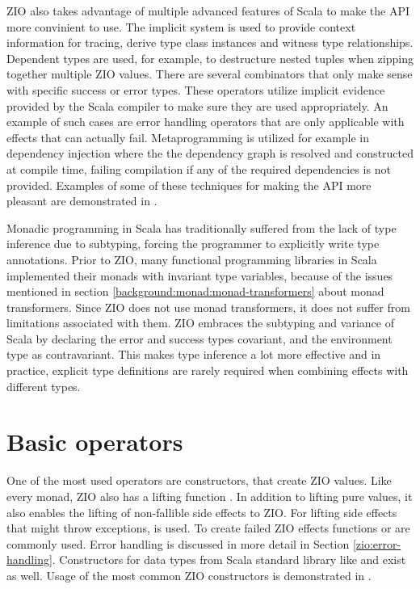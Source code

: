 ZIO also takes advantage of multiple advanced features of Scala to make the API more convinient to use. The implicit system is used to provide context information for tracing, derive type class instances and witness type relationships. Dependent types are used, for example, to destructure nested tuples when zipping together multiple ZIO values. There are several combinators that only make sense with specific success or error types. These operators utilize implicit evidence provided by the Scala compiler to make sure they are used appropriately. An example of such cases are error handling operators that are only applicable with effects that can actually fail. Metaprogramming is utilized for example in dependency injection where the the dependency graph is resolved and constructed at compile time, failing compilation if any of the required dependencies is not provided. Examples of some of these techniques for making the API more pleasant are demonstrated in .



Monadic programming in Scala has traditionally suffered from the lack of type inference due to subtyping, forcing the programmer to explicitly write type annotations. Prior to ZIO, many functional programming libraries in Scala implemented their monads with invariant type variables, because of the issues mentioned in section \ref{background:monad:monad-transformers} about monad transformers. Since ZIO does not use monad transformers, it does not suffer from limitations associated with them. ZIO embraces the subtyping and variance of Scala by declaring the error and success types covariant, and the environment type as contravariant. This makes type inference a lot more effective and in practice, explicit type definitions are rarely required when combining effects with different types.


\section{Basic operators}
One of the most used operators are constructors, that create ZIO values. Like every monad, ZIO also has a lifting function . In addition to lifting pure values, it also enables the lifting of non-fallible side effects to ZIO. For lifting side effects that might throw exceptions,  is used. To create failed ZIO effects functions  or  are commonly used. Error handling is discussed in more detail in Section \ref{zio:error-handling}. Constructors for data types from Scala standard library like  and  exist as well. Usage of the most common ZIO constructors is demonstrated in .


